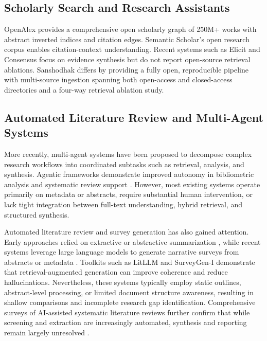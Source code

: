 \documentclass[conference,10pt,twocolumn]{IEEEtran}
\begin{document}
\subsection{Scholarly Search and Research Assistants}

OpenAlex \cite{priem2022openalex} provides a comprehensive open scholarly graph of 250M+ works with abstract inverted indices and citation edges. Semantic Scholar's open research corpus \cite{ammar2018construction} enables citation-context understanding. Recent systems such as Elicit and Consensus focus on evidence synthesis but do not report open-source retrieval ablations. Sanshodhak differs by providing a fully open, reproducible pipeline with multi-source ingestion spanning both open-access and closed-access directories and a four-way retrieval ablation study.

\subsection{Automated Literature Review and Multi-Agent Systems}

More recently, multi-agent systems have been proposed to decompose complex research workflows into coordinated subtasks such as retrieval, analysis, and synthesis. Agentic frameworks demonstrate improved autonomy in bibliometric analysis and systematic review support \cite{bara2024ai,sami2025system}. However, most existing systems operate primarily on metadata or abstracts, require substantial human intervention, or lack tight integration between full-text understanding, hybrid retrieval, and structured synthesis.

Automated literature review and survey generation has also gained attention. Early approaches relied on extractive or abstractive summarization \cite{gidiotis2021survey}, while recent systems leverage large language models to generate narrative surveys from abstracts or metadata \cite{chen2023litreviewgpt,xia2025design}. Toolkits such as LitLLM \cite{agarwal2024litllm} and SurveyGen-I \cite{chen2025surveygen} demonstrate that retrieval-augmented generation can improve coherence and reduce hallucinations. Nevertheless, these systems typically employ static outlines, abstract-level processing, or limited document structure awareness, resulting in shallow comparisons and incomplete research gap identification. Comprehensive surveys of AI-assisted systematic literature reviews further confirm that while screening and extraction are increasingly automated, synthesis and reporting remain largely unresolved \cite{bolanos2024ai,lai2024instruct}.
\end{document}
